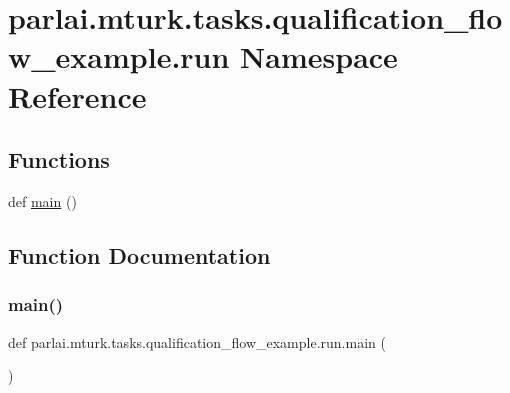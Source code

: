\hypertarget{namespaceparlai_1_1mturk_1_1tasks_1_1qualification__flow__example_1_1run}{}\section{parlai.\+mturk.\+tasks.\+qualification\+\_\+flow\+\_\+example.\+run Namespace Reference}
\label{namespaceparlai_1_1mturk_1_1tasks_1_1qualification__flow__example_1_1run}
\subsection*{Functions}
\begin{DoxyCompactItemize}
\item 
def \hyperlink{namespaceparlai_1_1mturk_1_1tasks_1_1qualification__flow__example_1_1run_a4bca4106989cf4085b207d8e5c0e66ab}{main} ()
\end{DoxyCompactItemize}


\subsection{Function Documentation}
\mbox{\label{namespaceparlai_1_1mturk_1_1tasks_1_1qualification__flow__example_1_1run_a4bca4106989cf4085b207d8e5c0e66ab}} 
\subsubsection{\texorpdfstring{main()}{main()}}
{\footnotesize\ttfamily def parlai.\+mturk.\+tasks.\+qualification\+\_\+flow\+\_\+example.\+run.\+main (\begin{DoxyParamCaption}{ }\end{DoxyParamCaption})}

